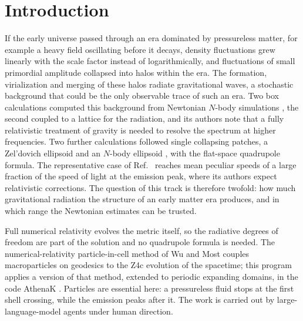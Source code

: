 \documentclass[aps,prd,twocolumn,10pt,superscriptaddress,nofootinbib,longbibliography,floatfix]{revtex4-2}
\begin{document}
\begin{abstract}
of the Newtonian mode on the same particles within a few percent, the strain over the box modes agrees between two meshes to a few percent, the constraint violation after the halos form barely falls with the spacing at one particle per cell but falls about twice per halving at eight, and a box at twice the amplitude matches the population at the same stage of growth, with a strain larger by the square of the amplitude ratio. The note closes with what the next stage needs.
\end{abstract}

\maketitle

\section{Introduction}\label{sec:intro}

If the early universe passed through an era dominated by pressureless matter, for example a heavy field oscillating before it decays, density fluctuations grew linearly with the scale factor instead of logarithmically, and fluctuations of small primordial amplitude collapsed into halos within the era. The formation, virialization and merging of these halos radiate gravitational waves, a stochastic background that could be the only observable trace of such an era. Two box calculations computed this background from Newtonian $N$-body simulations \cite{Eggemeier:2022gw,Fernandez:2023gw}, the second coupled to a lattice for the radiation, and its authors note that a fully relativistic treatment of gravity is needed to resolve the spectrum at higher frequencies. Two further calculations followed single collapsing patches, a Zel'dovich ellipsoid \cite{Dalianis:2024gw} and an $N$-body ellipsoid \cite{Escriva:2026gw}, with the flat-space quadrupole formula. The representative case of Ref.~\cite{Escriva:2026gw} reaches mean peculiar speeds of a large fraction of the speed of light at the emission peak, where its authors expect relativistic corrections. The question of this track is therefore twofold: how much gravitational radiation the structure of an early matter era produces, and in which range the Newtonian estimates can be trusted.

Full numerical relativity evolves the metric itself, so the radiative degrees of freedom are part of the solution and no quadrupole formula is needed. The numerical-relativity particle-in-cell method of Wu and Most \cite{Wu:2026nrpic} couples macroparticles on geodesics to the Z4c evolution of the spacetime; this program applies a version of that method, extended to periodic expanding domains, in the code AthenaK \cite{Stone:2024athenak}. Particles are essential here: a pressureless fluid stops at the first shell crossing, while the emission peaks after it. The work is carried out by large-language-model agents under human direction.
\end{document}
